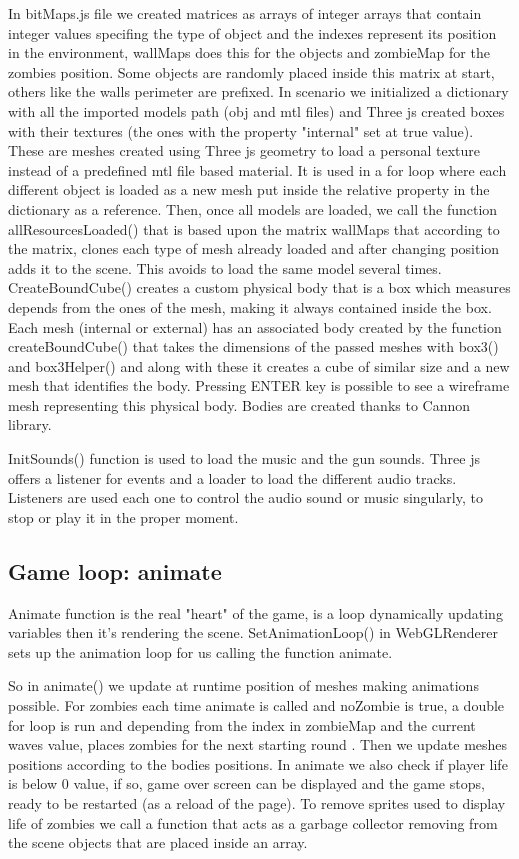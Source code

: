 \documentclass[14pt]{extarticle}
\begin{document}
In bitMaps.js file we created matrices as arrays of integer arrays that contain integer values specifing the type of object and the indexes represent its position in the environment, wallMaps does this for the objects and zombieMap for the zombies position.
Some objects are randomly placed inside this matrix at start, others like the walls perimeter are prefixed.
In scenario we initialized a dictionary with all the imported models path (obj and mtl files) and Three js created boxes with their textures (the ones with the property "internal" set at true value).  
These are meshes created using Three js geometry to load a personal texture instead of a predefined mtl file based material.
It is used in a for loop where each different object is loaded as a new mesh put inside the relative property in the dictionary as a reference.	Then, once all models  are loaded, we call the function allResourcesLoaded() that is based upon the matrix wallMaps that according to the matrix, clones each type of mesh already loaded and after changing position adds it to the scene. This avoids to load the same model several times.
CreateBoundCube() creates a custom physical body that is a box which measures depends from the ones of the mesh, making it always contained inside the box.
Each mesh (internal or external) has an associated body created by the function createBoundCube() that takes the dimensions of the passed meshes with box3() and box3Helper() and along with these it creates a cube of similar size and a new mesh that identifies the body.
 Pressing ENTER key is possible to see a wireframe mesh representing this physical body. Bodies are created thanks to Cannon library.

InitSounds() function is used to load the music and the gun sounds. Three js offers a listener for events and a loader to load the different audio tracks. Listeners are used each one to control the audio sound or music singularly, to stop or play it in the proper moment.

\subsection {Game loop: animate}
Animate function is the real "heart" of the game, is a loop dynamically updating variables then it’s rendering the scene.
SetAnimationLoop() in WebGLRenderer sets up the animation loop for us calling the function animate.

So in animate() we update at runtime position of meshes making animations possible.
For zombies each time animate is called and noZombie is true, a double for loop is run and depending from the index in zombieMap and the current waves value, places zombies for the next starting round .
Then we update meshes positions according to the bodies positions. In animate we also check if player life is below 0 value, if so, game over screen can be displayed and the game stops, ready to be restarted (as a reload of the page). To remove sprites used to display life of zombies we call a function that acts as a garbage collector removing from the scene objects that are placed inside an array.
\end{document}
